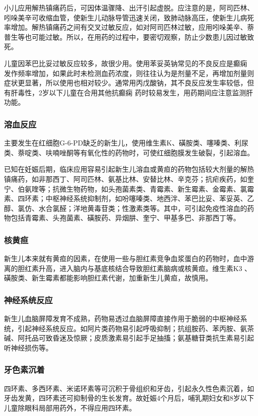 小儿应用解热镇痛药后，可因体温骤降、出汗引起虚脱。应注意的是，阿司匹林、吲哚美辛可收缩血管，使新生儿动脉导管迅速关闭，致肺动脉高压，使新生儿病死率增加。解热镇痛药之间有交叉过敏反应，如对阿司匹林过敏，应用吲哚美辛、萘普生等也可能过敏。所以，在用药的过程中，要密切观察，防止少数患儿因过敏致死。

儿童因苯巴比妥过敏反应较多，故很少用。使用苯妥英钠常见的不良反应是癫痫
发作频率增加，如果此时未检测血药浓度，则往往认为是剂量不足，再增加剂量则症状更显著，所以使用也相对较少。通常用丙戊酸钠，其不良反应发生率较低，但有肝毒性，2岁以下儿童在合用其他抗癫痫
药时较易发生，用药期间应注意监测肝功能。

\subsubsection{溶血反应}

主要发生在红细胞G-6-PD缺乏的新生儿，使用维生素K、磺胺类、噻嗪类、利尿类、萘啶类、呋喃唑酮等有氧化性的药物时，可使红细胞膜发生破裂，引起溶血。

已知在妊娠后期，临床应用容易引起新生儿溶血或黄疸的药物包括较大剂量的解热镇痛药，如非那西丁、阿司匹林、氨基比林、安替比林、辛克芬；抗疟疾药，如奎宁、伯氨喹等；抗微生物药物，如头孢菌素类、青霉素、新生霉素、金霉素、氯霉素、四环素；中枢神经系统抑制剂，如吩噻嗪类、地西泮、苯巴比妥、苯妥英、乙醇、氯仿、水合氯醛；洋地黄毒苷类；性激素类等。其中，可引起免疫性溶血的药物包括青霉素、头孢菌素、磺胺药、异烟肼、奎宁、甲基多巴、非那西丁等。

\subsubsection{核黄疸}

新生儿本来就有黄疸的因素，在使用一些与胆红素竞争血浆蛋白的药物时，血中游离的胆红素升高，进入脑内与基底核结合导致胆红素脑病或核黄疸。维生素K{3}
、磺胺类、新生霉素都能影响胆红素代谢，加重新生儿黄疸，故慎用。

\subsubsection{神经系统反应}

新生儿血脑屏障发育不成熟，药物易透过血脑屏障直接作用于脆弱的中枢神经系统，引起神经系统反应。如阿片类药物易引起呼吸抑制；抗组胺药、苯丙胺、氨茶碱、阿托品可致昏迷及惊厥；皮质激素易引起手足抽搐；氨基糖苷类抗生素易引起听神经损伤等。

\subsubsection{牙色素沉着}

四环素、多西环素、米诺环素等可沉积于骨组织和牙齿，引起永久性色素沉着，如牙齿发黄，四环素还可抑制骨的生长发育。故妊娠4个月后，哺乳期妇女和8岁以下儿童除眼科局部用药外，不得应用四环素。